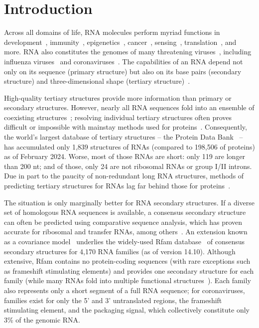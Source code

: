 \documentclass[main.tex]{subfiles}
\begin{document}
\section{Introduction}

Across all domains of life, RNA molecules perform myriad functions in development~\cite{Klattenhoff2013}, immunity~\cite{Wiedenheft2012}, epigenetics~\cite{Bhan2015}, cancer~\cite{Hajjari2015}, sensing~\cite{Kortmann2012,Serganov2013}, translation~\cite{Noller2012}, and more.
RNA also constitutes the genomes of many threatening viruses~\cite{Woolhouse2018}, including influenza viruses~\cite{Bouvier2008} and coronaviruses~\cite{Yang2015a}.
The capabilities of an RNA depend not only on its sequence (primary structure) but also on its base pairs (secondary structure) and three-dimensional shape (tertiary structure)~\cite{Mortimer2014}.

High-quality tertiary structures provide more information than primary or secondary structures.
However, nearly all RNA sequences fold into an ensemble of coexisting structures~\cite{Mustoe2014,Spitale2023}; resolving individual tertiary structures often proves difficult or impossible with mainstay methods used for proteins~\cite{Kappel2020}.
Consequently, the world's largest database of tertiary structures -- the Protein Data Bank~\cite{Berman2000} -- has accumulated only 1,839 structures of RNAs (compared to 198,506 of proteins) as of February 2024.
Worse, most of those RNAs are short: only 119 are longer than 200 nt; and of those, only 24 are not ribosomal RNAs or group I/II introns.
Due in part to the paucity of non-redundant long RNA structures, methods of predicting tertiary structures for RNAs lag far behind those for proteins~\cite{Schneider2023}.

The situation is only marginally better for RNA secondary structures.
If a diverse set of homologous RNA sequences is available, a consensus secondary structure can often be predicted using comparative sequence analysis, which has proven accurate for ribosomal and transfer RNAs, among others~\cite{Cannone2002}.
An extension known as a covariance model~\cite{Eddy1994} underlies the widely-used Rfam database~\cite{Kalvari2020} of consensus secondary structures for 4,170 RNA families (as of version 14.10).
Although extensive, Rfam contains no protein-coding sequences (with rare exceptions such as frameshift stimulating elements) and provides one secondary structure for each family (while many RNAs fold into multiple functional structures~\cite{Spitale2023}).
Each family also represents only a short segment of a full RNA sequence; for coronaviruses, families exist for only the 5' and 3' untranslated regions, the frameshift stimulating element, and the packaging signal, which collectively constitute only 3\% of the genomic RNA.
\end{document}
